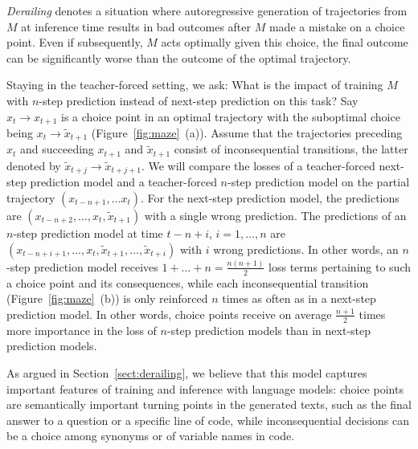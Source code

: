 \documentclass{article}
\theoremstyle{plain}
\theoremstyle{definition}
\theoremstyle{remark}
\begin{document}
\emph{Derailing} denotes a situation where autoregressive generation of trajectories from $M$ at inference time results in bad outcomes after $M$ made a mistake on a choice point. Even if subsequently, $M$ acts optimally given this choice, the final outcome can be significantly worse than the outcome of the optimal trajectory.

Staying in the teacher-forced setting, we ask: What is the impact of training $M$ with $n$-step prediction instead of next-step prediction on this task? Say $x_t \to x_{t+1}$ is a choice point in an optimal trajectory with the suboptimal choice being $x_t \to \tilde{x}_{t+1}$ (Figure~\ref{fig:maze}~(a)). Assume that the trajectories preceding $x_t$ and succeeding $x_{t+1}$ and $\tilde{x}_{t+1}$ consist of inconsequential transitions, the latter denoted by $\tilde{x}_{t+j} \to \tilde{x}_{t+j+1}$. We will compare the losses of a teacher-forced next-step prediction model and a teacher-forced $n$-step prediction model on the partial trajectory $(x_{t-n+1}, \ldots x_t)$. For the next-step prediction model, the predictions are $(x_{t-n+2}, \ldots, x_t, \tilde{x}_{t+1})$ with a single wrong prediction. The predictions of an $n$-step prediction model at time $t - n + i$, $i = 1, \ldots, n$ are $(x_{t-n+i+1}, \ldots, x_t, \tilde{x}_{t+1}, \ldots, \tilde{x}_{t+i})$ with $i$ wrong predictions. In other words, an $n$-step prediction model receives $1 + \ldots + n = \frac{n(n+1)}{2}$ loss terms pertaining to such a choice point and its consequences, while each inconsequential transition (Figure~\ref{fig:maze}~(b)) is only reinforced $n$ times as often as in a next-step prediction model. In other words, choice points receive on average $\frac{n+1}{2}$ times more importance in the loss of $n$-step prediction models than in next-step prediction models.

As argued in Section~\ref{sect:derailing}, we believe that this model captures important features of training and inference with language models: choice points are semantically important turning points in the generated texts, such as the final answer to a question or a specific line of code, while inconsequential decisions can be a choice among synonyms or of variable names in code.
\end{document}
